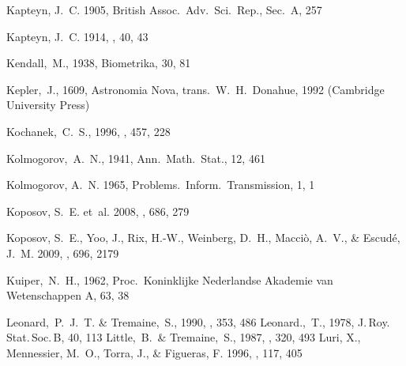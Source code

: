 \begin{thebibliography}{99}
{Kapteyn}, J.~C. 1905, {British Assoc.~Adv.~Sci.~Rep.}, Sec.~A, 257

{Kapteyn}, J.~C. 1914, \apj, 40, 43

  Kendall,~M., 1938,
  Biometrika, 30, 81

  Kepler,~J., 1609,
  Astronomia Nova,
  trans.\ W.~H.~Donahue, 1992
  (Cambridge University Press)

  Kochanek,~C.~S., 1996,
  \apj, 457, 228

  Kolmogorov,~A.~N., 1941,
  Ann.~Math.~Stat., 12, 461

{Kolmogorov}, A.~N. 1965, {Problems.~Inform.~Transmission}, 1, 1

{Koposov}, S.~E. {et~al.} 2008, \apj, 686, 279

{Koposov}, S.~E., {Yoo}, J., {Rix}, H.-W., {Weinberg}, D.~H., {Macci{\`o}},
  A.~V., \& {Escud{\'e}}, J.~M. 2009, \apj, 696, 2179

  Kuiper,~N.~H., 1962,
  Proc.~Koninklijke Nederlandse Akademie van Wetenschappen A, 63, 38

  Leonard,~P.~J.~T. \& Tremaine,~S., 1990,
  \apj, 353, 486
  Leonard.,~T., 1978,
  J.\,Roy.\,Stat.\,Soc.\,B, 40, 113
  Little,~B.~\& Tremaine,~S., 1987,
  \apj, 320, 493
{Luri}, X., {Mennessier}, M.~O., {Torra}, J., \& {Figueras}, F. 1996, \aaps,
  117, 405


\end{thebibliography}
